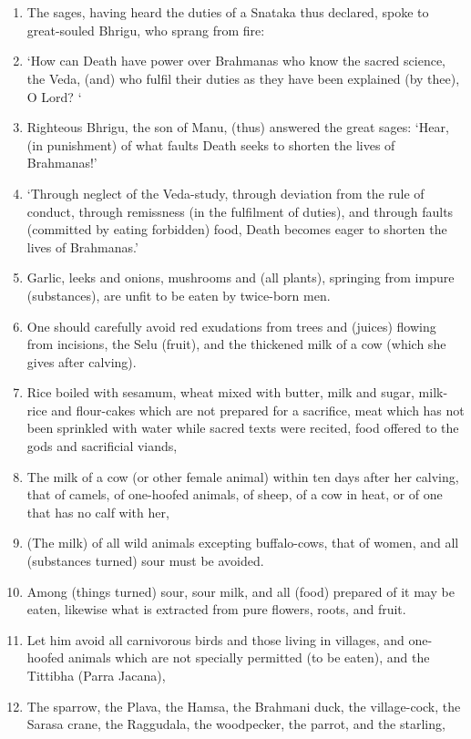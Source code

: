 \chapter{}
\begin{enumerate}
\item The sages, having heard the duties of a Snataka thus declared, spoke to great-souled Bhrigu, who sprang from fire:
\item `How can Death have power over Brahmanas who know the sacred science, the Veda, (and) who fulfil their duties as they have been explained (by thee), O Lord? `
\item Righteous Bhrigu, the son of Manu, (thus) answered the great sages: `Hear, (in punishment) of what faults Death seeks to shorten the lives of Brahmanas!'
\item `Through neglect of the Veda-study, through deviation from the rule of conduct, through remissness (in the fulfilment of duties), and through faults (committed by eating forbidden) food, Death becomes eager to shorten the lives of Brahmanas.'
\item Garlic, leeks and onions, mushrooms and (all plants), springing from impure (substances), are unfit to be eaten by twice-born men.
\item One should carefully avoid red exudations from trees and (juices) flowing from incisions, the Selu (fruit), and the thickened milk of a cow (which she gives after calving).
\item Rice boiled with sesamum, wheat mixed with butter, milk and sugar, milk-rice and flour-cakes which are not prepared for a sacrifice, meat which has not been sprinkled with water while sacred texts were recited, food offered to the gods and sacrificial viands,
\item The milk of a cow (or other female animal) within ten days after her calving, that of camels, of one-hoofed animals, of sheep, of a cow in heat, or of one that has no calf with her,
\item (The milk) of all wild animals excepting buffalo-cows, that of women, and all (substances turned) sour must be avoided.
\item Among (things turned) sour, sour milk, and all (food) prepared of it may be eaten, likewise what is extracted from pure flowers, roots, and fruit.
\item Let him avoid all carnivorous birds and those living in villages, and one-hoofed animals which are not specially permitted (to be eaten), and the Tittibha (Parra Jacana),
\item The sparrow, the Plava, the Hamsa, the Brahmani duck, the village-cock, the Sarasa crane, the Raggudala, the woodpecker, the parrot, and the starling,

\end{enumerate}
